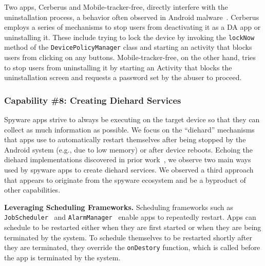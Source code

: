 \documentclass[sigconf,balance=false]{acmart}
\newcommand{\alex}[1]{\textcolor{chicagomaroon}{\noindent[AL: #1]}}
\newcommand{\alex}[1]{}
\begin{document}
Two apps, Cerberus and Mobile-tracker-free, directly interfere with the
uninstallation process, a behavior often observed in Android
malware~\cite{shan2019device,aljarrah2016maintaining}. Cerberus employs a series
of mechanisms to stop users from deactivating it as a DA app or
uninstalling it. These include trying to lock the device by invoking the
\texttt{lockNow} method of the \texttt{DevicePolicyManager} class and starting
an activity that blocks users from clicking on any buttons. Mobile-tracker-free,
on the other hand, tries to stop users from uninstalling it by starting an
Activity that blocks the uninstallation screen and requests a password set
by the abuser to proceed.

\subsubsection*{Capability \#8: Creating Diehard Services}
%
Spyware apps strive to always be executing on the target device so
that they can collect as much information as possible.  We focus on
the ``diehard'' mechanisms that apps use to automatically restart
themselves after being stopped by the Android system (e.g., due to low memory) or after device
reboots. Echoing the diehard implementations discovered in prior
work~\cite{shao2019lightweight,zhou2020demystifying}, we observe two
main ways used by spyware apps to create diehard services. We observed
a third approach that appears to originate from the spyware ecosystem
and be a byproduct of other capabilities.

\textbf{Leveraging Scheduling Frameworks.} Scheduling frameworks such as
\texttt{JobScheduler}~\cite{JobSched94:online} and
\texttt{AlarmManager}~\cite{AlarmMan39:online} enable apps to repeatedly
restart. Apps can schedule to be restarted either when they are
first started or when they are being terminated by the system. To schedule
themselves to be restarted shortly after they are terminated, they override the
\texttt{onDestory} function, which is called before the app is terminated by the
system.
\end{document}
